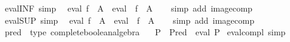 \begin{isabellebody}
\isanewline
\isanewline
{}\isamarkupfalse%
\ eval{\isacharunderscore}{\kern0pt}INF\ {\isacharbrackleft}{\kern0pt}simp{\isacharbrackright}{\kern0pt}{\isacharcolon}{\kern0pt}\isanewline
\ \ {\isachardoublequoteopen}eval\ {\isacharparenleft}{\kern0pt}{\isasymSqinter}{\isacharparenleft}{\kern0pt}f\ {\isacharbackquote}{\kern0pt}\ A{\isacharparenright}{\kern0pt}{\isacharparenright}{\kern0pt}\ {\isacharequal}{\kern0pt}\ {\isasymSqinter}{\isacharparenleft}{\kern0pt}{\isacharparenleft}{\kern0pt}eval\ {\isasymcirc}\ f{\isacharparenright}{\kern0pt}\ {\isacharbackquote}{\kern0pt}\ A{\isacharparenright}{\kern0pt}{\isachardoublequoteclose}\isanewline
%
\isadelimproof
\ \ %
\endisadelimproof
%
\isatagproof
{}\isamarkupfalse%
\ {\isacharparenleft}{\kern0pt}simp\ add{\isacharcolon}{\kern0pt}\ image{\isacharunderscore}{\kern0pt}comp{\isacharparenright}{\kern0pt}%
\endisatagproof
{\isafoldproof}%
%
\isadelimproof
\isanewline
%
\endisadelimproof
\isanewline
{}\isamarkupfalse%
\ eval{\isacharunderscore}{\kern0pt}SUP\ {\isacharbrackleft}{\kern0pt}simp{\isacharbrackright}{\kern0pt}{\isacharcolon}{\kern0pt}\isanewline
\ \ {\isachardoublequoteopen}eval\ {\isacharparenleft}{\kern0pt}{\isasymSqunion}{\isacharparenleft}{\kern0pt}f\ {\isacharbackquote}{\kern0pt}\ A{\isacharparenright}{\kern0pt}{\isacharparenright}{\kern0pt}\ {\isacharequal}{\kern0pt}\ {\isasymSqunion}{\isacharparenleft}{\kern0pt}{\isacharparenleft}{\kern0pt}eval\ {\isasymcirc}\ f{\isacharparenright}{\kern0pt}\ {\isacharbackquote}{\kern0pt}\ A{\isacharparenright}{\kern0pt}{\isachardoublequoteclose}\isanewline
%
\isadelimproof
\ \ %
\endisadelimproof
%
\isatagproof
{}\isamarkupfalse%
\ {\isacharparenleft}{\kern0pt}simp\ add{\isacharcolon}{\kern0pt}\ image{\isacharunderscore}{\kern0pt}comp{\isacharparenright}{\kern0pt}%
\endisatagproof
{\isafoldproof}%
%
\isadelimproof
\isanewline
%
\endisadelimproof
\isanewline
{}\isamarkupfalse%
\ pred\ {\isacharcolon}{\kern0pt}{\isacharcolon}{\kern0pt}\ {\isacharparenleft}{\kern0pt}type{\isacharparenright}{\kern0pt}\ complete{\isacharunderscore}{\kern0pt}boolean{\isacharunderscore}{\kern0pt}algebra\isanewline
{}\isanewline
\isanewline
{}\isamarkupfalse%
\isanewline
\ \ {\isachardoublequoteopen}{\isacharminus}{\kern0pt}\ P\ {\isacharequal}{\kern0pt}\ Pred\ {\isacharparenleft}{\kern0pt}{\isacharminus}{\kern0pt}\ eval\ P{\isacharparenright}{\kern0pt}{\isachardoublequoteclose}\isanewline
\isanewline
{}\isamarkupfalse%
\ eval{\isacharunderscore}{\kern0pt}compl\ {\isacharbrackleft}{\kern0pt}simp{\isacharbrackright}{\kern0pt}{\isacharcolon}{\kern0pt}\isanewline

\end{isabellebody}
